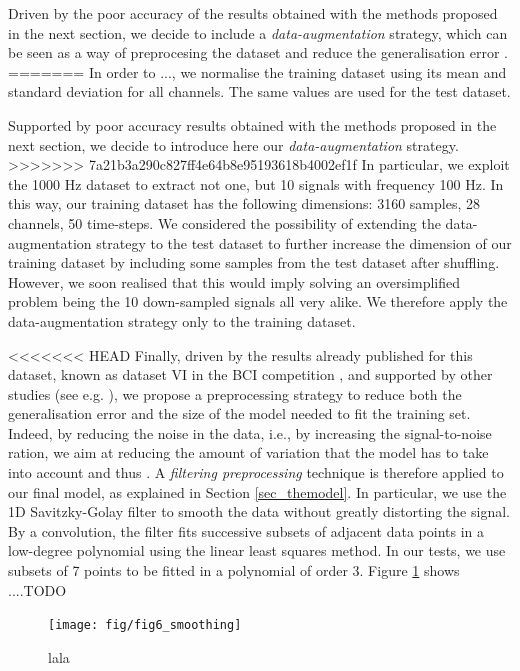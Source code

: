 \documentclass{article}
\begin{document}
Driven by the poor accuracy of the results obtained with the methods proposed in the next section, we decide to include a \emph{data-augmentation} strategy, which can be seen as a way of preprocesing the dataset and reduce the generalisation error \cite{goodfellow2016deep}. 
=======
  In order to ..., we  normalise the training dataset using its mean and standard deviation for all channels. 
  The same values are used for the test dataset. 
  
 Supported by poor accuracy results obtained with the methods proposed in the next section, we decide to introduce here our \emph{data-augmentation} strategy. 
>>>>>>> 7a21b3a290c827ff4e64b8e95193618b4002ef1f
In particular, we exploit the 1000 Hz dataset to extract not one, but 10  signals with frequency 100 Hz. 
In this way, our training dataset has the following dimensions: 3160 samples, 28 channels, 50 time-steps. 
We considered the possibility of extending the data-augmentation strategy to the test dataset to further increase the dimension of our training dataset by including some samples from the test dataset after shuffling. 
However, we soon realised that this would imply solving an oversimplified problem being the 10 down-sampled signals all very alike. 
We therefore apply the data-augmentation strategy only to the training dataset. 


<<<<<<< HEAD
Finally, driven by the results already published for this dataset, known as dataset VI in the BCI competition \cite{bci_ii}, and supported by other studies (see e.g. \cite{schirrmeister2017deep}), we propose a preprocessing strategy to reduce both the generalisation error and the size of the model needed to fit the training set.
Indeed, by reducing the noise in the data, i.e., by increasing the signal-to-noise ration, we aim at reducing the amount of variation that the model has to take into account \cite{goodfellow2016deep} and thus . 
A \emph{filtering preprocessing} technique is therefore applied to our  final model, as explained in Section \ref{sec_themodel}.
In particular, we use the 1D Savitzky-Golay filter \cite{savgol} to smooth the data without greatly distorting the signal. 
By a convolution, the filter fits successive subsets of adjacent data points in a low-degree polynomial using the linear least squares method. 
In our tests, we use subsets of 7 points to be fitted in a polynomial of order 3.
Figure \ref{fig_smoothig_savgol} shows ....TODO
 \begin{figure}[h]
 \begin{center}
  \texttt{[image: fig/fig6\_smoothing]} 
  \caption{lala
  \label{fig_smoothig_savgol}}
  \end{center}
  \end{figure}
\end{document}
